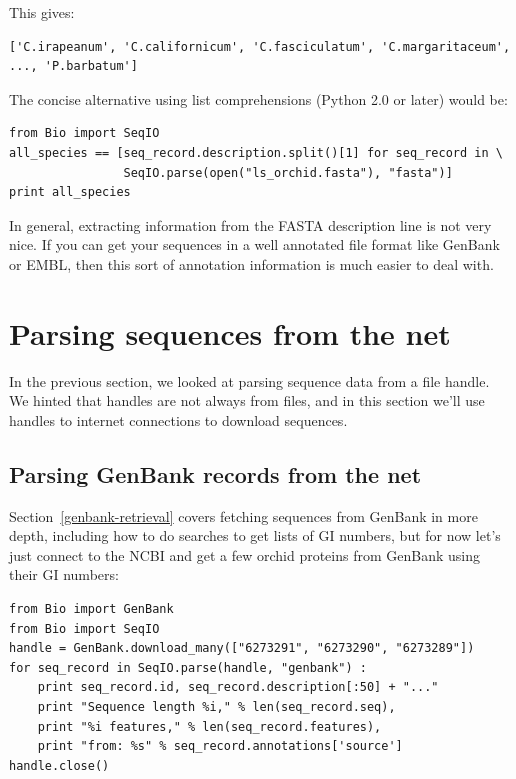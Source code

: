 \documentclass{report}
\begin{document}
\noindent This gives:

\begin{verbatim}
['C.irapeanum', 'C.californicum', 'C.fasciculatum', 'C.margaritaceum', ..., 'P.barbatum']
\end{verbatim}

The concise alternative using list comprehensions (Python 2.0 or later) would be:

\begin{verbatim}
from Bio import SeqIO
all_species == [seq_record.description.split()[1] for seq_record in \
                SeqIO.parse(open("ls_orchid.fasta"), "fasta")]
print all_species
\end{verbatim}

In general, extracting information from the FASTA description line is not very nice.  If you can get your sequences in a well annotated file format like GenBank or EMBL, then this sort of annotation information is much easier to deal with.

\section{Parsing sequences from the net}
\label{sec:SeqIO_Online}

In the previous section, we looked at parsing sequence data from a file handle.
We hinted that handles are not always from files, and in this section we'll use handles to internet connections to download sequences.

\subsection{Parsing GenBank records from the net}
\label{sec:SeqIO_GenBank_Online}

Section~\ref{genbank-retrieval} covers fetching sequences from GenBank in more depth, including how to do searches to get lists of GI numbers, but for now let's just connect to the NCBI and get a few orchid proteins from GenBank using their GI numbers:

\begin{verbatim}
from Bio import GenBank
from Bio import SeqIO
handle = GenBank.download_many(["6273291", "6273290", "6273289"])
for seq_record in SeqIO.parse(handle, "genbank") :
    print seq_record.id, seq_record.description[:50] + "..."
    print "Sequence length %i," % len(seq_record.seq),
    print "%i features," % len(seq_record.features),
    print "from: %s" % seq_record.annotations['source']
handle.close()
\end{verbatim}
\end{document}
